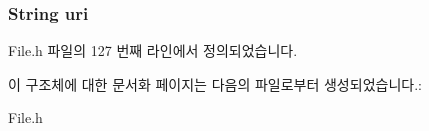 \hypertarget{struct__AudioExtends_ac0b02717b928a36338653c49b0821365}{
\subsubsection[{uri}]{\setlength{\rightskip}{0pt plus 5cm}String uri}}\label{struct__AudioExtends_ac0b02717b928a36338653c49b0821365}


File.\-h 파일의 127 번째 라인에서 정의되었습니다.



이 구조체에 대한 문서화 페이지는 다음의 파일로부터 생성되었습니다.\-:\begin{DoxyCompactItemize}
\item 
File.\-h\end{DoxyCompactItemize}
